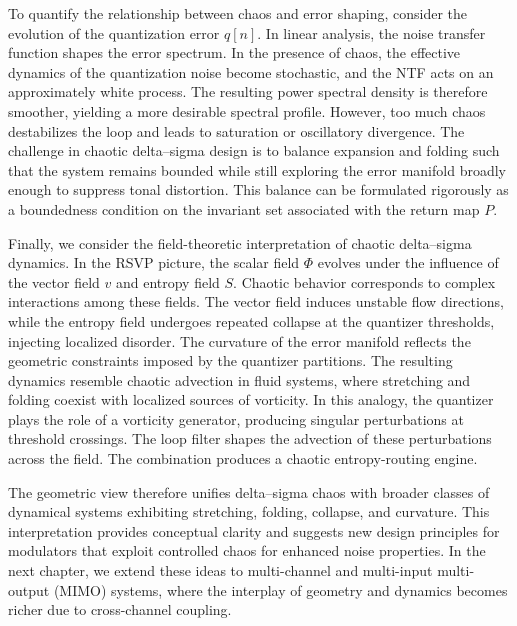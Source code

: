 To quantify the relationship between chaos and error shaping, consider the evolution of the quantization error \(q[n]\). In linear analysis, the noise transfer function shapes the error spectrum. In the presence of chaos, the effective dynamics of the quantization noise become stochastic, and the NTF acts on an approximately white process. The resulting power spectral density is therefore smoother, yielding a more desirable spectral profile. However, too much chaos destabilizes the loop and leads to saturation or oscillatory divergence. The challenge in chaotic delta–sigma design is to balance expansion and folding such that the system remains bounded while still exploring the error manifold broadly enough to suppress tonal distortion. This balance can be formulated rigorously as a boundedness condition on the invariant set associated with the return map \(P\).

Finally, we consider the field-theoretic interpretation of chaotic delta–sigma dynamics. In the RSVP picture, the scalar field \(\Phi\) evolves under the influence of the vector field \(v\) and entropy field \(S\). Chaotic behavior corresponds to complex interactions among these fields. The vector field induces unstable flow directions, while the entropy field undergoes repeated collapse at the quantizer thresholds, injecting localized disorder. The curvature of the error manifold reflects the geometric constraints imposed by the quantizer partitions. The resulting dynamics resemble chaotic advection in fluid systems, where stretching and folding coexist with localized sources of vorticity. In this analogy, the quantizer plays the role of a vorticity generator, producing singular perturbations at threshold crossings. The loop filter shapes the advection of these perturbations across the field. The combination produces a chaotic entropy-routing engine.

The geometric view therefore unifies delta–sigma chaos with broader classes of dynamical systems exhibiting stretching, folding, collapse, and curvature. This interpretation provides conceptual clarity and suggests new design principles for modulators that exploit controlled chaos for enhanced noise properties. In the next chapter, we extend these ideas to multi-channel and multi-input multi-output (MIMO) systems, where the interplay of geometry and dynamics becomes richer due to cross-channel coupling.


